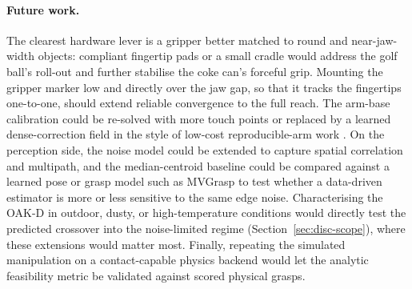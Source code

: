 \paragraph{Future work.}
The clearest hardware lever is a gripper better matched to round and near-jaw-width objects:
compliant fingertip pads or a small cradle would address the golf ball's roll-out and further
stabilise the coke can's forceful grip. Mounting the gripper marker low and directly over the
jaw gap, so that it tracks the fingertips one-to-one, should extend reliable convergence to
the full reach. The arm-base calibration could be re-solved with more touch points or replaced
by a learned dense-correction field in the style of low-cost reproducible-arm work
\cite{yang2019replab}. On the perception side, the noise model could be extended to capture
spatial correlation and multipath, and the median-centroid baseline could be compared against
a learned pose or grasp model such as MVGrasp \cite{kasaei2021mvgrasp} to test whether a
data-driven estimator is more or less sensitive to the same edge noise. Characterising the
OAK-D in outdoor, dusty, or high-temperature conditions would directly test the predicted
crossover into the noise-limited regime (Section~\ref{sec:disc-scope}), where these
extensions would matter most. Finally, repeating the
simulated manipulation on a contact-capable physics backend would let the analytic feasibility
metric be validated against scored physical grasps.


